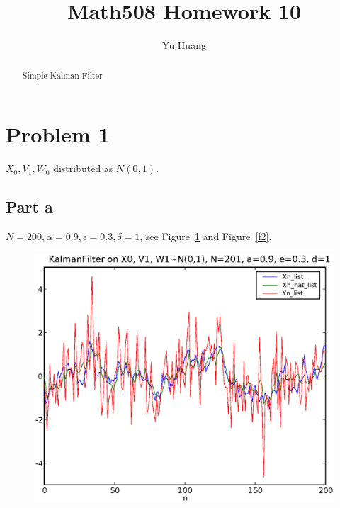 \documentclass[a4paper,10pt]{article}
\title{Math508 Homework 10}
\author{Yu Huang}
\begin{document}
\maketitle

\begin{abstract}
Simple Kalman Filter
\end{abstract}

\section{Problem 1}
$X_0, V_1, W_0$ distributed as $N(0,1)$.

\subsection{Part a}
$N=200, \alpha=0.9, \epsilon=0.3, \delta=1$, see Figure~\ref{f1} and Figure~\ref{f2}.

\begin{figure}
\includegraphics[width=1\textwidth]{hw10_1_N_201_a_0.9_e_0.3_d_1.eps}
\caption{}\label{f1}
\end{figure}
\end{document}
